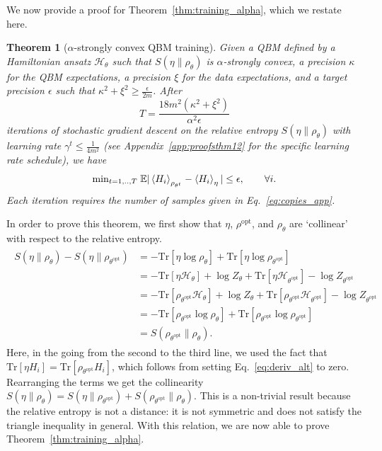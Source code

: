\documentclass[
    aps,
    prx,
    floatfix,
    nofootinbib,
    onecolumn
]{revtex4-2}
\newcommand{\Tr}{\mathrm{Tr}}
\newtheorem{theorem}{Theorem}
\begin{document}
We now provide a proof for Theorem~\ref{thm:training_alpha}, which we restate here. 

\begingroup
\def\thetheorem{2}
\begin{theorem}[$\alpha$-strongly convex QBM training]
Given a QBM defined by a Hamiltonian ansatz $\mathcal{H}_\theta$ such that $S(\eta\|\rho_\theta)$ is $\alpha$-strongly convex, a precision $\kappa$ for the QBM expectations, a precision $\xi$ for the data expectations, and a target precision $\epsilon$ such that $\kappa^2 + \xi^2 \geq \frac{\epsilon}{2m}$. After
\begin{equation}
    T =\frac{18 m^2 (\kappa^2 + \xi^2)}{\alpha^2\epsilon}
\end{equation} 
iterations of stochastic gradient descent on the relative entropy $S(\eta \|\rho_\theta)$ with learning rate $\gamma^t \leq \frac{1}{4m^2}$ (see Appendix~\ref{app:proofsthm12} for the specific learning rate schedule), we have
\begin{equation}
    \mathrm{min}_{t=1,..,T} \; \mathbb{E}| \expval{H_i}_{\rho_{\theta^t}}  - \expval{H_i}_\eta | \leq \epsilon, \qquad \forall i.
\end{equation} 
Each iteration requires the number of samples given in Eq.~\eqref{eq:copies_app}. 
\end{theorem} 
\endgroup

In order to prove this theorem, we first show that $\eta$, $\rho^\mathrm{opt}$, and $\rho_\theta$ are `collinear' with respect to the relative entropy. 
\begin{align}
\begin{split}
\label{eq:collinear}
    S(\eta \| \rho_{\theta}) - S(\eta \| \rho_{\theta^\mathrm{opt}})&= -\Tr[\eta \log \rho_\theta ] + \Tr[ \eta \log \rho_{\theta^\mathrm{opt}}] \\
    &= -\Tr[\eta \mathcal{H}_\theta] + \log Z_\theta + \Tr[\eta \mathcal{H}_{\theta^\mathrm{opt}}] - \log Z_{\theta^\mathrm{opt}} \\
    &= -\Tr[\rho_{\theta^\mathrm{opt}} \mathcal{H}_\theta] + \log Z_\theta + \Tr[\rho_{\theta^\mathrm{opt}} \mathcal{H}_{\theta^\mathrm{opt}}] - \log Z_{\theta^\mathrm{opt}} \\
    &= -\Tr[\rho_{\theta^\mathrm{opt}} \log \rho_{\theta} ] + \Tr[\rho_{\theta^\mathrm{opt}} \log \rho_{\theta^\mathrm{opt}} ]  \\
    &= S(\rho_{\theta^\mathrm{opt}} \| \rho_{\theta}) .
\end{split}
\end{align}
Here, in the going from the second to the third line, we used the fact that $\Tr[\eta H_i] = \Tr[\rho_{\theta^{\mathrm{opt}}} H_i]$, which follows from setting Eq.~\eqref{eq:deriv_alt} to zero. Rearranging the terms we get the collinearity $S(\eta \| \rho_{\theta}) = S(\eta \| \rho_{\theta^\mathrm{opt}}) + S(\rho_{\theta^\mathrm{opt}} \| \rho_{\theta})$.  
This is a non-trivial result because the relative entropy is not a distance: it is not symmetric and does not satisfy the triangle inequality in general. With this relation, we are now able to prove Theorem~\ref{thm:training_alpha}. 
\end{document}
